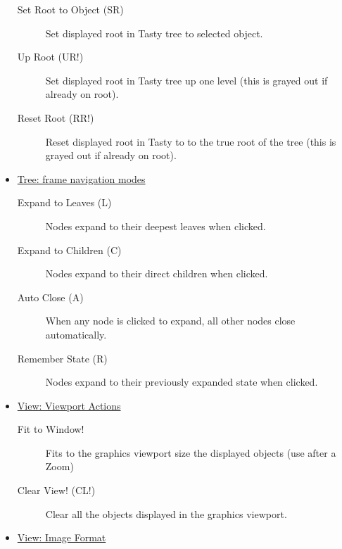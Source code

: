 \documentclass [11pt]{book}
\begin{document}
\begin{itemize}
\begin{description}
\item [Set Root to Object (SR)]
Set displayed root in Tasty tree to selected object.

\item [Up Root (UR!)]
Set displayed root in Tasty tree up one level (this is grayed out if already on root).

\item [Reset Root (RR!)]
Reset displayed root in Tasty to to the true root of the tree (this is grayed out if already on root).

\end{description}



\item 
\underline{Tree: frame navigation modes}

\begin{description}

\item [Expand to Leaves (L)]
Nodes expand to their deepest leaves when clicked. 

\item [Expand to Children (C)]
Nodes expand to their direct children when clicked.

\item [Auto Close (A)]
When any node is clicked to expand, all other nodes close automatically.

\item [Remember State (R)]
Nodes expand to their previously expanded state when clicked.

\end{description}



\item 
\underline{View: Viewport Actions}

\begin{description}

\item [Fit to Window!]
Fits to the graphics viewport size the displayed objects (use after a Zoom)

\item [Clear View! (CL!)]
Clear all the objects displayed in the graphics viewport.

\end{description}



\item 
\underline{View: Image Format}

\begin{description}


\end{description}
\end{itemize}
\end{document}
